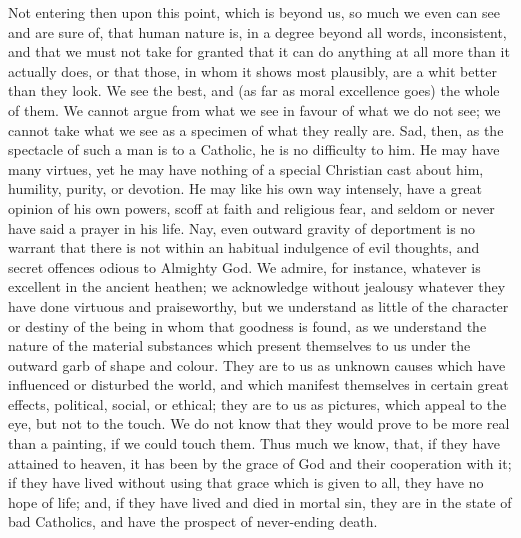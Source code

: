 Not entering then upon this point, which is beyond us, so much we
even can see and are sure of, that human nature is, in a degree beyond
all words, inconsistent, and that we must not take for granted that it
can do anything at all more than it actually does, or that those, in
whom it shows most plausibly, are a whit better than they look. We see
the best, and (as far as moral excellence goes) the whole of them. We
cannot argue from what we see in favour of what we do not see; we
cannot take what we see as a specimen of what they really are. Sad,
then, as the spectacle of such a man is to a Catholic, he is no
difficulty to him. He may have many virtues, yet he may have nothing
of a special Christian cast about him, humility, purity, or devotion.
He may like his own way intensely, have a great opinion of his own
powers, scoff at faith and religious fear, and seldom or never have
said a prayer in his life. Nay, even outward gravity of deportment is
no warrant that there is not within an habitual indulgence of evil
thoughts, and secret offences odious to Almighty God. We admire, for
instance, whatever is excellent in the ancient heathen; we acknowledge
without jealousy whatever they have done virtuous and praiseworthy,
but we understand as little of the character or destiny of the being
in whom that goodness is found, as we understand the nature of the
material substances which present themselves to us under the outward
garb of shape and colour. They are to us as unknown causes which have
influenced or disturbed the world, and which manifest themselves in
certain great effects, political, social, or ethical; they are to us
as pictures, which appeal to the eye, but not to the touch. We do not
know that they would prove to be more real than a painting, if we
could touch them. Thus much we know, that, if they have attained to
heaven, it has been by the grace of God and their cooperation with it;
if they have lived without using that grace which is given to all,
they have no hope of life; and, if they have lived and died in mortal
sin, they are in the state of bad Catholics, and have the prospect of
never-ending death.

